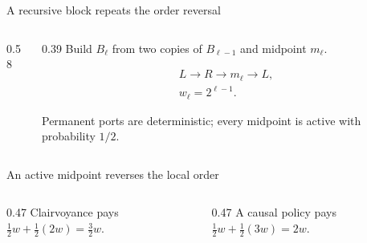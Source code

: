 \documentclass[aspectratio=169,12pt]{beamer}
\newcommand{\1}{\mathbf{1}}
\begin{document}
\begin{frame}{A recursive block repeats the order reversal}
  \begin{columns}[T,onlytextwidth]
    \begin{column}{0.58\textwidth}
      \centering
      \resizebox{0.79\linewidth}{!}{\StRecursiveBlock}
    \end{column}
    \begin{column}{0.39\textwidth}
      Build \(B_\ell\) from two copies of \(B_{\ell-1}\) and midpoint \(m_\ell\).

      \[
        \begin{gathered}
          L\longrightarrow R\longrightarrow m_\ell\longrightarrow L,\\[-1mm]
          w_\ell=2^{\ell-1}.
        \end{gathered}
      \]

      Permanent ports are deterministic; every midpoint is active with
      probability \(1/2\).

      \vspace{0.28cm}
    \end{column}
  \end{columns}
\end{frame}

\begin{frame}{An active midpoint reverses the local order}
  \centering
  \resizebox{0.88\linewidth}{!}{\StLocalChoice}

  \vspace{0.02cm}
  \begin{columns}[T,onlytextwidth]
    \begin{column}{0.47\textwidth}
      \centering
      Clairvoyance pays
      \(\tfrac12w+\tfrac12(2w)=\tfrac32w\).
    \end{column}
    \begin{column}{0.47\textwidth}
      \centering
      A causal policy pays
      \(\tfrac12w+\tfrac12(3w)=2w\).
    \end{column}
  \end{columns}
\end{frame}
\end{document}
